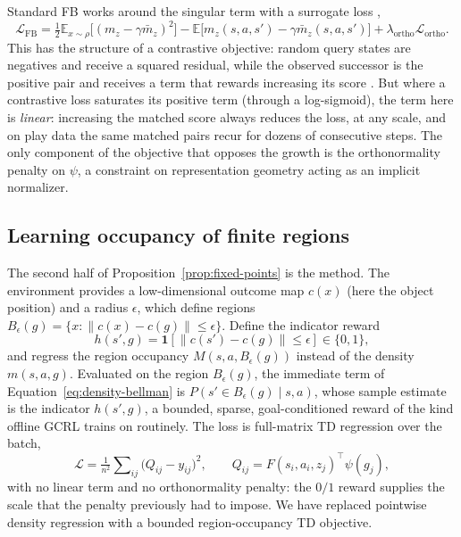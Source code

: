 \documentclass{article}
\newcommand{\E}{\mathbb{E}}
\newcommand{\ind}[1]{\mathbf{1}\!\left[#1\right]}
\newcommand{\cube}{c}
\begin{document}
Standard FB works around the singular term with a surrogate loss \citep{touati2021learning},
\begin{equation}
\label{eq:fb-loss}
\mathcal{L}_{\mathrm{FB}} = \tfrac{1}{2}\E_{x\sim\rho}\big[(m_z-\gamma\bar m_z)^2\big] -\E\big[m_z(s,a,s')-\gamma\bar m_z(s,a,s')\big] +\lambda_{\mathrm{ortho}}\mathcal{L}_{\mathrm{ortho}}.
\end{equation}
This has the structure of a contrastive objective: random query states are negatives and receive a squared residual, while the observed successor is the positive pair and receives a term that rewards increasing its score \citep{eysenbach2022contrastive}.
But where a contrastive loss saturates its positive term (through a log-sigmoid), the term here is \emph{linear}: increasing the matched score always reduces the loss, at any scale, and on play data the same matched pairs recur for dozens of consecutive steps.
The only component of the objective that opposes the growth is the orthonormality penalty on $\psi$, a constraint on representation geometry acting as an implicit normalizer.

\subsection{Learning occupancy of finite regions}
\label{sec:regions}

The second half of Proposition~\ref{prop:fixed-points} is the method.
The environment provides a low-dimensional outcome map $\cube(x)$ (here the object position) and a radius $\epsilon$, which define regions $B_\epsilon(g)=\{x:\|\cube(x)-\cube(g)\|\le\epsilon\}$.
Define the indicator reward
\begin{equation}
\label{eq:hit}
h(s',g)=\ind{\|\cube(s')-\cube(g)\|\le\epsilon}\in\{0,1\},
\end{equation}
and regress the region occupancy $M(s,a,B_\epsilon(g))$ instead of the density $m(s,a,g)$.
Evaluated on the region $B_\epsilon(g)$, the immediate term of Equation~\ref{eq:density-bellman} is $P(s'\in B_\epsilon(g)\mid s,a)$, whose sample estimate is the indicator $h(s',g)$, a bounded, sparse, goal-conditioned reward of the kind offline GCRL trains on routinely.
The loss is full-matrix TD regression over the batch,
\begin{equation}
\label{eq:matrix-loss}
\mathcal{L}=\tfrac{1}{n^2}\sum\nolimits_{ij}\big(Q_{ij}-y_{ij}\big)^2, \qquad Q_{ij}=F(s_i,a_i,z_j)^{\top}\psi(g_j),
\end{equation}
with no linear term and no orthonormality penalty: the $0/1$ reward supplies the scale that the penalty previously had to impose.
We have replaced pointwise density regression with a bounded region-occupancy TD objective.
\end{document}
